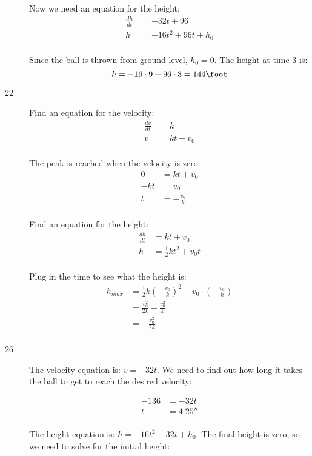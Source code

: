 \documentclass{exam}
\begin{document}
\begin{description}
Now we need an equation for the height:
\begin{align*}
  \frac{dh}{dt} &= -32t + 96 \\
  h &= -16t^2 + 96t + h_0 \\
\end{align*}

Since the ball is thrown from ground level, $h_0 = 0$.  The height at time 3 is:
\[
  h = -16 \cdot 9 + 96 \cdot 3 = 144 \foot \\
\]

\item[22]
Find an equation for the velocity:
\begin{align*}
  \frac{dv}{dt} &= k \\
  v &= kt + v_0 \\
\end{align*}

The peak is reached when the velocity is zero:
\begin{align*}
  0 &= kt + v_0 \\
  -kt &= v_0 \\
  t &= - \frac{v_0}{k} \\
\end{align*}

Find an equation for the height:
\begin{align*}
  \frac{dh}{dt} &= kt + v_0 \\
  h &= \frac{1}{2} kt^2 + v_0 t \\
\end{align*}

Plug in the time to see what the height is:
\begin{align*}
  h_{max} &= \frac{1}{2} k \left( - \frac{v_0}{k} \right)^2 + v_0 \cdot \left( - \frac{v_0}{k} \right) \\
         &= \frac{v_0^2}{2k} - \frac{v_0^2}{k} \\
         &= - \frac{v_0^2}{2k} \\
\end{align*}

\item[26]
The velocity equation is: $v = -32t$.  We need to find out how long it takes the ball to get to reach the desired velocity:

\begin{align*}
  -136 &= -32t \\
  t &= 4.25 \second \\
\end{align*}

The height equation is: $h = -16t^2 - 32t + h_0$.  The final height is zero, so we need to solve for the initial height:


\end{description}
\end{document}
